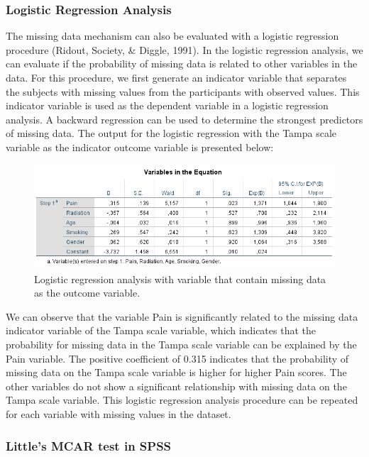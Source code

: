 \documentclass[]{book}
\theoremstyle{definition}
\theoremstyle{definition}
\theoremstyle{definition}
\theoremstyle{remark}
\begin{document}
\subsubsection{Logistic Regression
Analysis}\label{logistic-regression-analysis}

The missing data mechanism can also be evaluated with a logistic
regression procedure (Ridout, Society, \& Diggle, 1991). In the logistic
regression analysis, we can evaluate if the probability of missing data
is related to other variables in the data. For this procedure, we first
generate an indicator variable that separates the subjects with missing
values from the participants with observed values. This indicator
variable is used as the dependent variable in a logistic regression
analysis. A backward regression can be used to determine the strongest
predictors of missing data. The output for the logistic regression with
the Tampa scale variable as the indicator outcome variable is presented
below:

\begin{figure}

{\centering \includegraphics[width=0.9\linewidth]{images/tab2.6} 

}

\caption{Logistic regression analysis with variable that contain missing data as the outcome variable.}\label{fig:tab2-6}
\end{figure}

We can observe that the variable Pain is significantly related to the
missing data indicator variable of the Tampa scale variable, which
indicates that the probability for missing data in the Tampa scale
variable can be explained by the Pain variable. The positive coefficient
of 0.315 indicates that the probability of missing data on the Tampa
scale variable is higher for higher Pain scores. The other variables do
not show a significant relationship with missing data on the Tampa scale
variable. This logistic regression analysis procedure can be repeated
for each variable with missing values in the dataset.

\subsubsection{Little's MCAR test in
SPSS}\label{littles-mcar-test-in-spss}
\end{document}
